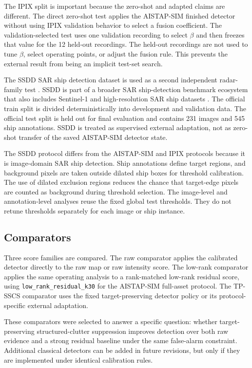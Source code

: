 \documentclass[journal]{IEEEtran}
\begin{document}
The IPIX split is important because the zero-shot and adapted claims are different. The direct zero-shot test applies the AISTAP-SIM finished detector without using IPIX validation behavior to select a fusion coefficient. The validation-selected test uses one validation recording to select $\beta$ and then freezes that value for the 12 held-out recordings. The held-out recordings are not used to tune $\beta$, select operating points, or adjust the fusion rule. This prevents the external result from being an implicit test-set search.

The SSDD SAR ship detection dataset is used as a second independent radar-family test \cite{wang2019ssdd,zhang2021ssdd}. SSDD is part of a broader SAR ship-detection benchmark ecosystem that also includes Sentinel-1 and high-resolution SAR ship datasets \cite{huang2018opensarship,wei2020hrsid}. The official train split is divided deterministically into development and validation data. The official test split is held out for final evaluation and contains 231 images and 545 ship annotations. SSDD is treated as supervised external adaptation, not as zero-shot transfer of the saved AISTAP-SIM detector state.

The SSDD protocol differs from the AISTAP-SIM and IPIX protocols because it is image-domain SAR ship detection. Ship annotations define target regions, and background pixels are taken outside dilated ship boxes for threshold calibration. The use of dilated exclusion regions reduces the chance that target-edge pixels are counted as background during threshold selection. The image-level and annotation-level analyses reuse the fixed global test thresholds. They do not retune thresholds separately for each image or ship instance.

\subsection{Comparators}

Three score families are compared. The raw comparator applies the calibrated detector directly to the raw map or raw intensity score. The low-rank comparator applies the same operating analysis to a rank-matched low-rank residual score, using \texttt{low\_rank\_residual\_k30} for the AISTAP-SIM full-asset protocol. The TP-SSCS comparator uses the fixed target-preserving detector policy or its protocol-specific external adaptation.

These comparators were selected to answer a specific question: whether target-preserving structured-clutter suppression improves detection over both raw evidence and a strong residual baseline under the same false-alarm constraint. Additional classical detectors can be added in future revisions, but only if they are implemented under identical calibration rules.
\end{document}
